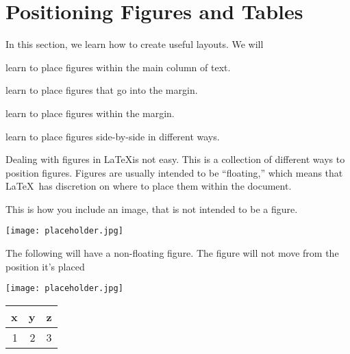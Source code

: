 \documentclass[10pt,oneside]{book}
\begin{document}





\newpage


\section{Positioning Figures and Tables}


\begin{objectives}{In this section, we learn how to create useful layouts. We will}
    \item
      learn to place figures within the main column of text.
    \item
      learn to place figures that go into the margin.
    \item
      learn to place figures within the margin.
    \item
      learn to place figures side-by-side in different ways.
  \end{objectives}


Dealing with figures in \LaTeX is not easy.  This is a collection of different 
ways to position figures.  Figures are usually intended to be ``floating,'' which
means that \LaTeX\ has discretion on where to place them within the document.


This is how you include an image, that is not intended to be a figure.

\texttt{[image: placeholder.jpg]}

The following will have a non-floating figure. The figure will not move from the position it's placed

\noindent
\begin{minipage}{0.9\linewidth}
  \centering
  \texttt{[image: placeholder.jpg]}
  \label{fig:notfloatfig}
\end{minipage}



\begin{margintable}
  \centering
  \caption{This is a caption for a table that will be placed in the margin.}
  \label{tab:margintab}
  \begin{tabular}{rrr}
    \toprule
    x & y & z \\
    \midrule
    1 & 2 & 3 \\
    \bottomrule
  \end{tabular}
\end{margintable}
\end{document}
